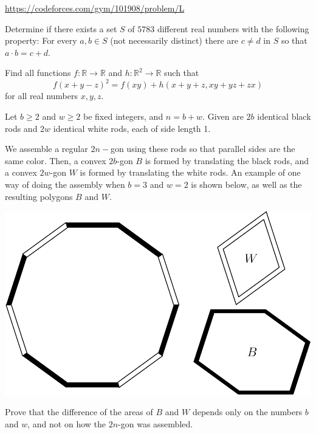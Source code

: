 \documentclass[11pt]{scrartcl}
\begin{document}
\begin{problem}
\url{https://codeforces.com/gym/101908/problem/L}
\end{problem}
\begin{problem}[Israel 2023/6]
Determine if there exists a set $S$ of $5783$ different real numbers with the following property:
For every $a,b\in S$ (not necessarily distinct) there are $c\neq d$ in $S$ so that $a\cdot b=c+d$.
\end{problem}
\begin{problem}[Mongolia 2023/4]
Find all functions $f : \mathbb{R} \to \mathbb{R}$ and $h : \mathbb{R}^2 \to \mathbb{R}$ such that\[f(x+y-z)^2=f(xy)+h(x+y+z, xy+yz+zx)\]for all real numbers $x,y,z$.
\end{problem}
\begin{problem}[USAMO 2022/2]
    	Let $b\geq2$ and $w\geq2$ be fixed integers, and $n=b+w$. Given are $2b$ identical black rods and $2w$ identical white rods, each of side length 1.

We assemble a regular $2n-$gon using these rods so that parallel sides are the same color. Then, a convex $2b$-gon $B$ is formed by translating the black rods, and a convex $2w$-gon $W$ is formed by translating the white rods. An example of one way of doing the assembly when $b=3$ and $w=2$ is shown below, as well as the resulting polygons $B$ and $W$.

\begin{center}
\includegraphics[scale=0.5]{USAMO2022_2.png}
\end{center}
Prove that the difference of the areas of $B$ and $W$ depends only on the numbers $b$ and $w$, and not on how the $2n$-gon was assembled.
\end{problem}
\end{document}
